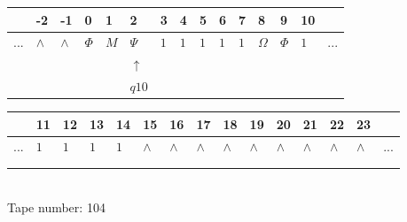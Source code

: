 \documentclass[11pt]{article}
\begin{document}
\begin{table}[H]
\centering
\begin{tabular}{lllllllllllllll}
 & -2 & -1 & 0 & 1 & 2 & 3 & 4 & 5 & 6 & 7 & 8 & 9 & 10 & \\
\hline
$...$ & \multicolumn{1}{|l|}{$\wedge$} & \multicolumn{1}{|l|}{$\wedge$} & \multicolumn{1}{|l|}{$\Phi$} & \multicolumn{1}{|l|}{$M$} & \multicolumn{1}{|l|}{$\Psi$} & \multicolumn{1}{|l|}{$1$} & \multicolumn{1}{|l|}{$1$} & \multicolumn{1}{|l|}{$1$} & \multicolumn{1}{|l|}{$1$} & \multicolumn{1}{|l|}{$1$} & \multicolumn{1}{|l|}{$\Omega$} & \multicolumn{1}{|l|}{$\Phi$} & \multicolumn{1}{|l|}{$1$} & $...$\\
\hline
&  &  &  &  & $\uparrow$ &  &  &  &  &  &  &  &  &  \\
&  &  &  &  & $ q10 $ &  &  &  &  &  &  &  &  &  \\
\end{tabular}
\begin{tabular}{lllllllllllllll}
 & 11 & 12 & 13 & 14 & 15 & 16 & 17 & 18 & 19 & 20 & 21 & 22 & 23 & \\
\hline
$...$ & \multicolumn{1}{|l|}{$1$} & \multicolumn{1}{|l|}{$1$} & \multicolumn{1}{|l|}{$1$} & \multicolumn{1}{|l|}{$1$} & \multicolumn{1}{|l|}{$\wedge$} & \multicolumn{1}{|l|}{$\wedge$} & \multicolumn{1}{|l|}{$\wedge$} & \multicolumn{1}{|l|}{$\wedge$} & \multicolumn{1}{|l|}{$\wedge$} & \multicolumn{1}{|l|}{$\wedge$} & \multicolumn{1}{|l|}{$\wedge$} & \multicolumn{1}{|l|}{$\wedge$} & \multicolumn{1}{|l|}{$\wedge$} & $...$\\
\hline
&  &  &  &  &  &  &  &  &  &  &  &  &  &  \\
&  &  &  &  &  &  &  &  &  &  &  &  &  &  \\
\end{tabular}
\\
Tape number: 104
\noindent\makebox[\linewidth]{\hdashrule{\textwidth}{1pt}{1pt}}\end{table}
\end{document}
